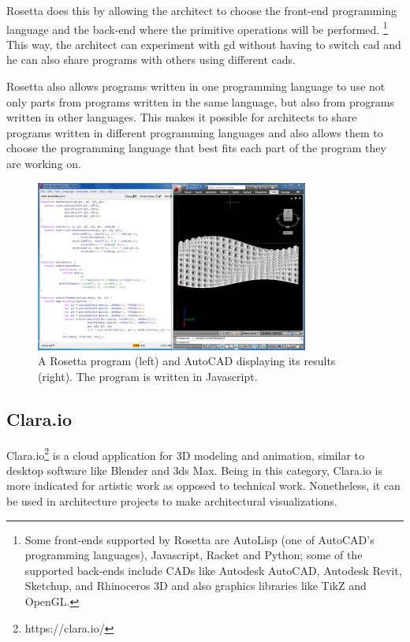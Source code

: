 Rosetta does this by allowing the architect to choose the front-end programming language and the back-end where the primitive operations will be performed\cite{de2012modern}.%
\footnote{Some front-ends supported by Rosetta are AutoLisp (one of AutoCAD's programming languages), Javascript, Racket and Python; some of the supported back-ends include CADs like Autodesk AutoCAD, Autodesk Revit, Sketchup, and Rhinoceros 3D and also graphics libraries like TikZ and OpenGL.}
This way, the architect can experiment with \gls{gd} without having to switch \gls{cad} and he can also share programs with others using different \glspl{cad}.

Rosetta also allows programs written in one programming language to use not only parts from programs written in the same language, but also from programs written in other languages.
This makes it possible for architects to share programs written in different programming languages and also allows them to choose the programming language that best fits each part of the program they are working on.

\begin{figure}
	\centering
	\includegraphics[width=0.8\textwidth]{images/rosetta_js_autocad}
	\caption{A Rosetta program (left) and AutoCAD displaying its results (right). The program is written in Javascript.}
	\label{fig:rosetta:ex}
\end{figure}


\subsection{Clara.io}
Clara.io\footnote{https://clara.io/}\cite{houston2013clara} is a cloud application for 3D modeling and animation, similar to desktop software like Blender and 3ds Max.
Being in this category, Clara.io is more indicated for artistic work as opposed to technical work.
Nonetheless, it can be used in architecture projects to make architectural visualizations.

